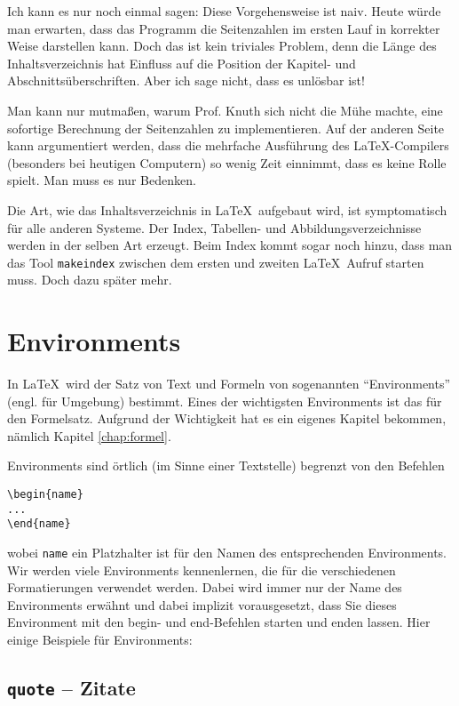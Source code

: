 Ich kann es nur noch einmal sagen: Diese Vorgehensweise ist naiv. Heute würde man erwarten, dass das Programm die Seitenzahlen im ersten Lauf in korrekter Weise darstellen kann. Doch das ist kein triviales Problem, denn die Länge des Inhaltsverzeichnis hat Einfluss auf die Position der Kapitel- und Abschnittsüberschriften. Aber ich sage nicht, dass es unlösbar ist! 

Man kann nur mutmaßen, warum Prof. Knuth sich nicht die Mühe machte, eine sofortige Berechnung der Seitenzahlen zu implementieren. Auf der anderen Seite kann argumentiert werden, dass die mehrfache Ausführung des \LaTeX-Compilers (besonders bei heutigen Computern) so wenig Zeit einnimmt, dass es keine Rolle spielt. Man muss es nur Bedenken.

Die Art, wie das Inhaltsverzeichnis in \LaTeX\ aufgebaut wird, ist symptomatisch für alle anderen Systeme. Der Index, Tabellen- und Abbildungsverzeichnisse werden in der selben Art erzeugt. Beim Index kommt sogar noch hinzu, dass man das Tool \texttt{makeindex} zwischen dem ersten und zweiten \LaTeX\ Aufruf starten muss. Doch dazu später mehr. 


\section{Environments}

In \LaTeX\ wird der Satz von Text und Formeln von sogenannten "`Environments"' (engl. für Umgebung) bestimmt. Eines der wichtigsten Environments ist das für den Formelsatz. Aufgrund der Wichtigkeit hat es ein eigenes Kapitel bekommen, nämlich Kapitel \ref{chap:formel}.

Environments sind örtlich (im Sinne einer Textstelle) begrenzt von den Befehlen 
\begin{verbatim}
\begin{name}
...
\end{name}
\end{verbatim}
wobei \texttt{name} ein Platzhalter ist für den Namen des entsprechenden Environments. Wir werden viele Environments kennenlernen, die für die verschiedenen Formatierungen verwendet werden. Dabei wird immer nur der Name des Environments erwähnt und dabei implizit vorausgesetzt, dass Sie dieses Environment mit den begin- und end-Befehlen starten und enden lassen. Hier einige Beispiele für Environments:

\subsection{\texttt{quote} -- Zitate}


